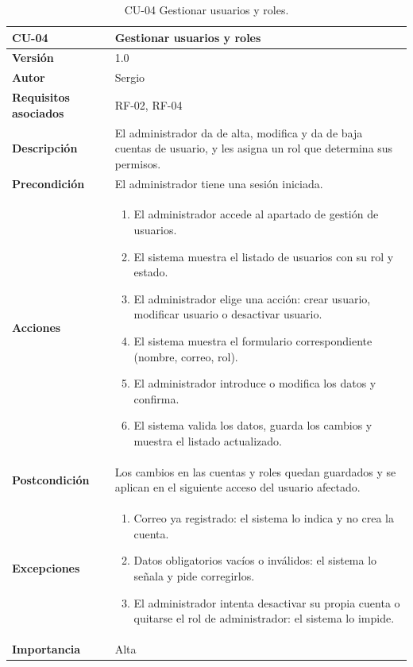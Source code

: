 \begin{table}[p]
	\centering
	\begin{tabularx}{\linewidth}{ p{} p{} }
		\toprule
		\textbf{CU-04}    & \textbf{Gestionar usuarios y roles}\\
		\toprule
		\textbf{Versión}              & 1.0    \\
		\textbf{Autor}                & Sergio \\
		\textbf{Requisitos asociados} & RF-02, RF-04 \\
		\textbf{Descripción}          & El administrador da de alta, modifica y da de baja cuentas de usuario, y les asigna un rol que determina sus permisos. \\
		\textbf{Precondición}         & El administrador tiene una sesión iniciada. \\
		\textbf{Acciones}             &
		\begin{enumerate}
			\def\labelenumi{\arabic{enumi}.}
			\tightlist
			\item El administrador accede al apartado de gestión de usuarios.
			\item El sistema muestra el listado de usuarios con su rol y estado.
			\item El administrador elige una acción: crear usuario, modificar usuario o desactivar usuario.
			\item El sistema muestra el formulario correspondiente (nombre, correo, rol).
			\item El administrador introduce o modifica los datos y confirma.
			\item El sistema valida los datos, guarda los cambios y muestra el listado actualizado.
		\end{enumerate}\\
		\textbf{Postcondición}        & Los cambios en las cuentas y roles quedan guardados y se aplican en el siguiente acceso del usuario afectado. \\
		\textbf{Excepciones}          &
		\begin{enumerate}
			\def\labelenumi{\arabic{enumi}.}
			\tightlist
			\item Correo ya registrado: el sistema lo indica y no crea la cuenta.
			\item Datos obligatorios vacíos o inválidos: el sistema lo señala y pide corregirlos.
			\item El administrador intenta desactivar su propia cuenta o quitarse el rol de administrador: el sistema lo impide.
		\end{enumerate}\\
		\textbf{Importancia}          & Alta \\
		\bottomrule
	\end{tabularx}
	\caption{CU-04 Gestionar usuarios y roles.}
\end{table}

